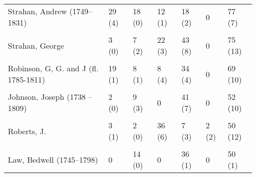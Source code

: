\documentclass[
]{article}
\begin{document}
\begin{table}
{\begin{tabular}[t]{lllllll}
Strahan, Andrew (1749–1831) & 29 (4) & 18 (0) & 12 (1) & 18 (2) & 0 & 77 (7)\\
\cellcolor{gray!6}{Baldwin, Richard (1724–1770)} & \cellcolor{gray!6}{20 (1)} & \cellcolor{gray!6}{31 (3)} & \cellcolor{gray!6}{2 (0)} & \cellcolor{gray!6}{24 (3)} & \cellcolor{gray!6}{0} & \cellcolor{gray!6}{77 (7)}\\
Strahan, George & 3 (0) & 7 (2) & 22 (3) & 43 (8) & 0 & 75 (13)\\
\cellcolor{gray!6}{Donaldson, Alexander (1727–1794)} & \cellcolor{gray!6}{8 (1)} & \cellcolor{gray!6}{17 (3)} & \cellcolor{gray!6}{18 (2)} & \cellcolor{gray!6}{25 (7)} & \cellcolor{gray!6}{2 (1)} & \cellcolor{gray!6}{70 (14)}\\
\addlinespace
Robinson, G, G. and J (fl. 1785-1811) & 19 (1) & 8 (1) & 8 (4) & 34 (4) & 0 & 69 (10)\\
\cellcolor{gray!6}{Balfour, John (1715–1795)} & \cellcolor{gray!6}{18 (2)} & \cellcolor{gray!6}{5 (1)} & \cellcolor{gray!6}{6 (1)} & \cellcolor{gray!6}{33 (9)} & \cellcolor{gray!6}{0} & \cellcolor{gray!6}{62 (13)}\\
Johnson, Joseph (1738 –1809) & 2 (0) & 9 (3) & 0 & 41 (7) & 0 & 52 (10)\\
\cellcolor{gray!6}{Davies, William (fl. 1793-1836)} & \cellcolor{gray!6}{15 (0)} & \cellcolor{gray!6}{14 (0)} & \cellcolor{gray!6}{12 (1)} & \cellcolor{gray!6}{11 (1)} & \cellcolor{gray!6}{0} & \cellcolor{gray!6}{52 (2)}\\
Roberts, J. & 3 (1) & 2 (0) & 36 (6) & 7 (3) & 2 (2) & 50 (12)\\
\addlinespace
\cellcolor{gray!6}{Longman, Thomas (1699–1755)} & \cellcolor{gray!6}{7 (0)} & \cellcolor{gray!6}{9 (1)} & \cellcolor{gray!6}{4 (1)} & \cellcolor{gray!6}{28 (2)} & \cellcolor{gray!6}{2 (1)} & \cellcolor{gray!6}{50 (5)}\\
Law, Bedwell (1745–1798) & 0 & 14 (0) & 0 & 36 (1) & 0 & 50 (1)\\
\bottomrule
\end{tabular}}
\end{table}
\end{document}
